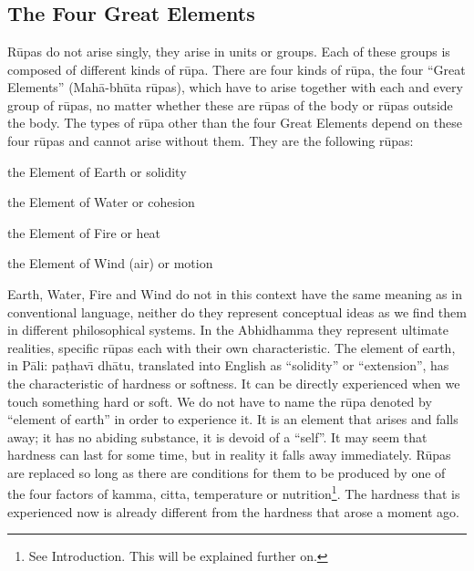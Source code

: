 \documentclass{book}
\begin{document}
\mainmatter 
\chapter[The Four Great Elements]{}  
\section*{The Four Great Elements}

R\=upas do not arise singly, they arise in units or groups. Each of
these groups is composed of different kinds of r\=upa. There are four
kinds of r\=upa, the four ``Great Elements'' (Mah{\=a}-bh\=uta
r\=upas), which have to arise together with each and every group of
r\=upas, no matter whether these are r\=upas of the body or r\=upas
outside the body. The types of r\=upa other than the four Great
Elements depend on these four r\=upas and cannot arise without them.
They are the following r\=upas:




\begin{description}
\item the Element of Earth or solidity

\item the Element of Water or cohesion

\item the Element of Fire or heat

\item the Element of Wind (air) or motion
\end{description}




Earth, Water, Fire and Wind do not in this context have the same meaning
as in conventional language, neither do they represent conceptual ideas
as we find them in different philosophical systems. In the Abhidhamma
they represent ultimate realities, specific r\=upas each with their own
characteristic. The element of earth, in P{\=a}li: pa\d thav\=\i{} 
dh{\=a}tu, translated into English as ``solidity'' or ``extension'',
has the characteristic of hardness or softness. It can be directly
experienced when we touch something hard or soft. We do not have to
name the r\=upa denoted by ``element of earth'' in order to
experience it. It is an element that arises and falls away; it has no
abiding substance, it is devoid of a ``self''. It may seem that
hardness can last for some time, but in reality it falls away
immediately. R\=upas are replaced so long as there are conditions for
them to be produced by one of the four factors of kamma, citta,
temperature or nutrition\footnote{See Introduction. This will be
explained further on.}. The hardness that is experienced now is already
different from the hardness that arose a moment ago.
\end{document}
